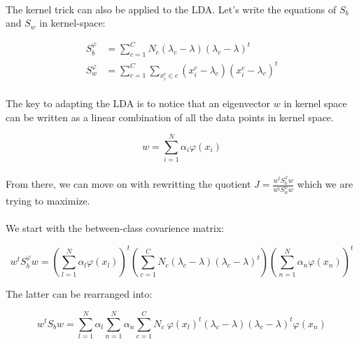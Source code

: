 \paragraph{}
The kernel trick can also be applied to the LDA. Let's write the equations of $S_b$ and $S_w$ in kernel-space:

\begin{align*}
S_b^\varphi &= \sum_{c = 1}^C N_c(\lambda_c - \lambda)(\lambda_c - \lambda)^t \\
S_w^\varphi &= \sum_{c = 1}^{C}\sum_{x_i^c \in c} (x_i^c - \lambda_c)(x_i^c - \lambda_c)^t
\end{align*}

\paragraph{}
The key to adapting the LDA is to notice that an eigenvector $w$ in kernel space can be written as a
linear combination of all the data points in kernel space.

\begin{equation}
\label{eq:phibase}
w = \sum_{i=1}^N \alpha_i \varphi(x_i)
\end{equation}

\paragraph{}
From there, we can move on with rewritting the quotient $J = \frac{w^tS_b^\varphi w}{w^tS_w^\varphi w}$ which we are
trying to maximize.

\paragraph{}
We start with the between-class covarience matrix:

\begin{equation*}
w^tS_b^\varphi w = \left( \sum_{l=1}^N \alpha_l \varphi(x_l)\right)^t
            \left( \sum_{c=1}^C N_c(\lambda_c - \lambda)(\lambda_c - \lambda)^t\right)
            \left( \sum_{n=1}^N \alpha_n \varphi(x_n)\right)^t 
\end{equation*}

The latter can be rearranged into:

\begin{equation*}
w^tS_bw = \sum_{l=1}^N\alpha_l \sum_{n=1}^N \alpha_n \sum_{c =1}^C
                N_c ~\varphi(x_l)^t(\lambda_c - \lambda)(\lambda_c - \lambda)^t\varphi(x_n)
\end{equation*}

